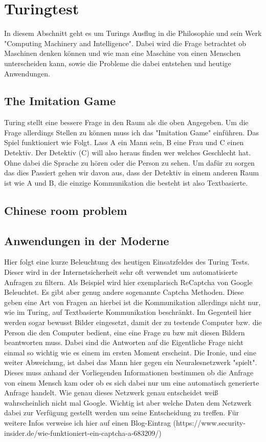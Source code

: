 \section{Turingtest}
In diesem Abschnitt geht es um Turings Ausflug in die Philosophie und sein Werk "Computing Machinery and Intelligence". Dabei wird die Frage betrachtet ob Maschinen denken können und wie man eine Maschine von einen Menschen unterscheiden kann, sowie die Probleme die dabei entstehen und heutige Anwendungen.
\subsection{The Imitation Game}
Turing stellt eine bessere Frage in den Raum als die oben Angegeben. Um die Frage allerdings Stellen zu können muss ich das "Imitation Game" einführen. Das Spiel funktioniert wie Folgt. Lass A ein Mann sein, B eine Frau und C einen Detektiv. Der Detektiv (C) will also heraus finden wer welches Geschlecht hat. Ohne dabei die Sprache zu hören oder die Person zu sehen. Um dafür zu sorgen das dies Passiert gehen wir davon aus, dass der Detektiv in einem anderen Raum ist wie A und B, die einzige Kommunikation die besteht ist also Textbasierte.
\subsection{Chinese room problem}
\subsection{Anwendungen in der Moderne}
Hier folgt eine kurze Beleuchtung des heutigen Einsatzfeldes des Turing Tests. Dieser wird in der Internetsicherheit sehr oft verwendet um automatisierte Anfragen zu filtern. Als Beispiel wird hier exemplarisch ReCaptcha von Google Beleuchtet. Es gibt aber genug andere sogenannte Captcha Methoden. Diese geben eine Art von Fragen an hierbei ist die Kommunikation allerdings nicht nur, wie im Turing, auf Textbasierte Kommunikation beschränkt. Im Gegenteil hier werden sogar bewusst Bilder eingesetzt, damit der zu testende Computer bzw. die Person die den Computer bedient, eine eine Frage zu bzw mit diesen Bildern beantworten muss. Dabei sind die Antworten auf die Eigentliche Frage nicht einmal so wichtig wie es einem im ersten Moment erscheint. Die Ironie, und eine weiter Abweichung, ist dabei das Mann hier gegen ein Neuralesnetzwerk "spielt". Dieses muss anhand der Vorliegenden Informationen bestimmen ob die Anfrage von einem Mensch kam oder ob es sich dabei nur um eine automatisch generierte Anfrage handelt. Wie genau dieses Netzwerk genau entscheidet weiß wahrscheinlich nicht mal Google. Wichtig ist aber welche Daten dem Netzwerk dabei zur Verfügung gestellt werden um seine Entscheidung zu treffen. Für weitere Infos verweise ich hier auf einen Blog-Eintrag (https://www.security-insider.de/wie-funktioniert-ein-captcha-a-683209/)